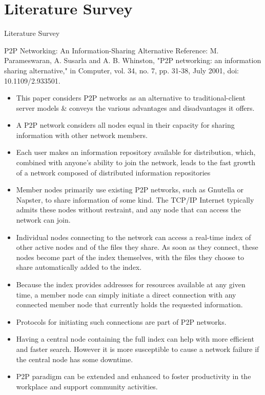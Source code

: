 \documentclass[9pt]{beamer}
\begin{document}
\section{Literature Survey}
\begin{frame}{}
    \large Literature Survey
\end{frame}
\begin{frame}{P2P Networking: An Information-Sharing Alternative}
Reference: 
\small M. Parameswaran, A. Susarla and A. B. Whinston, "P2P networking: an information sharing alternative," in Computer, vol. 34, no. 7, pp. 31-38, July 2001, doi: 10.1109/2.933501.
\break
\begin{itemize}
     \item This paper considers P2P networks as an alternative to traditional-client server models \& conveys the various advantages and disadvantages it offers. 
     \item A P2P network considers all nodes equal in their capacity for sharing information with other network members. 
     \item Each user makes an information repository available for distribution, which, combined with anyone’s ability to join the network, leads to the fast growth of a network composed of distributed information repositories
     \item Member nodes primarily use existing P2P networks, such as Gnutella or Napster, to share information of some kind. The TCP/IP Internet typically admits these nodes without restraint, and any node that can access the network can join.
\end{itemize}
\end{frame}
\begin{frame}{}
\begin{itemize}
    \item Individual nodes connecting to the network can access a real-time index of other active nodes and of the files they share. As soon as they connect, these nodes become part of the index themselves, with the files they choose to share automatically added to the index.
    \item Because the index provides addresses for resources available at any given time, a member node can simply initiate a direct connection with any connected member node that currently holds the requested information.
    \item Protocols for initiating such connections are part of P2P networks.
    \item Having a central node containing the full index can help with more efficient and faster search. However it is more susceptible to cause a network failure if the central node has some downtime. 
    \item P2P paradigm can be extended and enhanced to foster productivity in the workplace and support community activities.
\end{itemize}
    
\end{frame}
\end{document}
